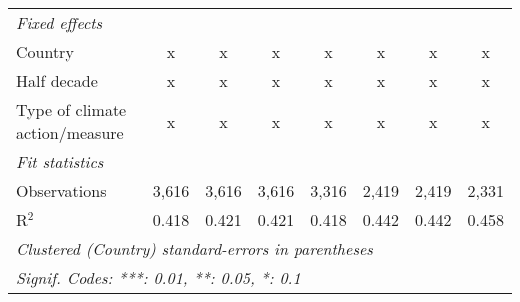 \begin{tabular}{lccccccc}
   \emph{Fixed effects}\\
   Country                                                                                                   & x             & x             & x             & x             & x             & x            & x\\  
   Half decade                                                                                               & x             & x             & x             & x             & x             & x            & x\\  
   Type of climate action/measure                                                                            & x             & x             & x             & x             & x             & x            & x\\  
   \midrule \emph{Fit statistics}\\
   Observations                                                                                              & 3,616         & 3,616         & 3,616         & 3,316         & 2,419         & 2,419        & 2,331\\  
   R$^2$                                                                                                     & 0.418         & 0.421         & 0.421         & 0.418         & 0.442         & 0.442        & 0.458\\  
   \midrule
   \multicolumn{8}{l}{\emph{Clustered (Country) standard-errors in parentheses}}\\
   \multicolumn{8}{l}{\emph{Signif. Codes: ***: 0.01, **: 0.05, *: 0.1}}\\
\end{tabular}
\par\endgroup


